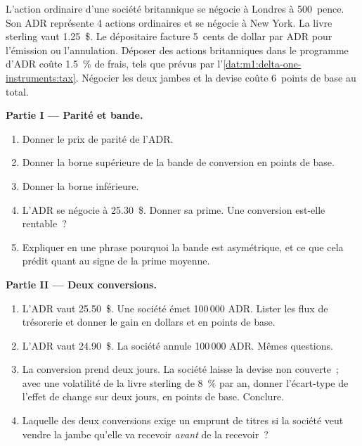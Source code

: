 \begin{problem}\label{pb:m1:delta-one-instruments:1}
L'action ordinaire d'une société britannique se négocie à Londres à 500~pence. Son ADR représente 4
actions ordinaires et se négocie à New York. La livre sterling vaut 1.25~\$. Le dépositaire
facture 5~cents de dollar par ADR pour l'émission ou l'annulation. Déposer des actions
britanniques dans le programme d'ADR coûte 1.5~\% de frais, tels que prévus par
l'\cref{dat:m1:delta-one-instruments:tax}. Négocier les deux jambes et la devise coûte
6~points de base au total.

\medskip\noindent\textbf{Partie I --- Parité et bande.}
\begin{enumerate}
\item Donner le prix de parité de l'ADR.
\item Donner la borne supérieure de la bande de conversion en points de base.
\item Donner la borne inférieure.
\item L'ADR se négocie à 25.30~\$. Donner sa prime. Une conversion est-elle rentable~?
\item Expliquer en une phrase pourquoi la bande est asymétrique, et ce que cela
prédit quant au signe de la prime moyenne.
\end{enumerate}

\medskip\noindent\textbf{Partie II --- Deux conversions.}
\begin{enumerate}[resume]
\item L'ADR vaut 25.50~\$. Une société émet 100\,000 ADR. Lister les flux de trésorerie
et donner le gain en dollars et en points de base.
\item L'ADR vaut 24.90~\$. La société annule 100\,000 ADR. Mêmes questions.
\item La conversion prend deux jours. La société laisse la devise non couverte~; avec
une volatilité de la livre sterling de 8~\% par an, donner l'écart-type
de l'effet de change sur deux jours, en points de base. Conclure.
\item Laquelle des deux conversions exige un emprunt de titres si la société veut
vendre la jambe qu'elle va recevoir \emph{avant} de la recevoir~?
\end{enumerate}


\end{problem}
